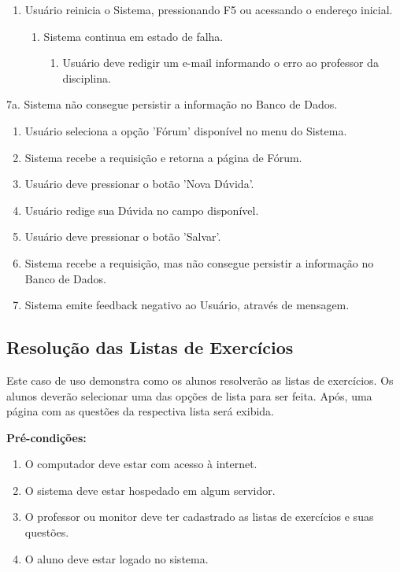 \documentclass[graduacao,brazil]{ThesisPUC}
\begin{document}
\begin{enumerate}
  \item Usu\'{a}rio reinicia o Sistema, pressionando F5 ou acessando o endere\c{c}o inicial.
    \begin{enumerate}
      \item Sistema continua em estado de falha.
      \begin{enumerate}
	\item Usu\'{a}rio deve redigir um e-mail informando o erro ao professor da disciplina.
      \end{enumerate}
    \end{enumerate}
\end{enumerate}

7a. Sistema n\~{a}o consegue persistir a informa\c{c}\~{a}o no Banco de Dados.

\begin{enumerate}
  \item Usu\'{a}rio seleciona a op\c{c}\~{a}o 'F\'{o}rum' dispon\'{i}vel no menu do Sistema.
  \item Sistema recebe a requisi\c{c}\~{a}o e retorna a p\'{a}gina de F\'{o}rum.
  \item Usu\'{a}rio deve pressionar o bot\~{a}o 'Nova D\'{u}vida'.
  \item Usu\'{a}rio redige sua D\'{u}vida no campo dispon\'{i}vel.
  \item Usu\'{a}rio deve pressionar o bot\~{a}o 'Salvar'.
  \item Sistema recebe a requisi\c{c}\~{a}o, mas n\~{a}o consegue persistir a informa\c{c}\~{a}o no Banco de Dados.
  \item Sistema emite feedback negativo ao Usu\'{a}rio, atrav\'{e}s de mensagem.
\end{enumerate}

\subsection{Resolu\c{c}\~{a}o das Listas de Exerc\'{i}cios}

Este caso de uso demonstra como os alunos resolver\~{a}o as listas de exerc\'{i}cios.
Os alunos dever\~{a}o selecionar uma das op\c{c}\~{o}es de lista para ser feita.
Ap\'{o}s, uma p\'{a}gina com as quest\~{o}es da respectiva lista ser\'{a} exibida.

\textbf{Pré-condições:}

\begin{enumerate}
  \item O computador deve estar com acesso \`{a} internet.
  \item O sistema deve estar hospedado em algum servidor.
  \item O professor ou monitor deve ter cadastrado as listas de exerc\'{i}cios e suas quest\~{o}es.
  \item O aluno deve estar logado no sistema.
\end{enumerate}
\end{document}
